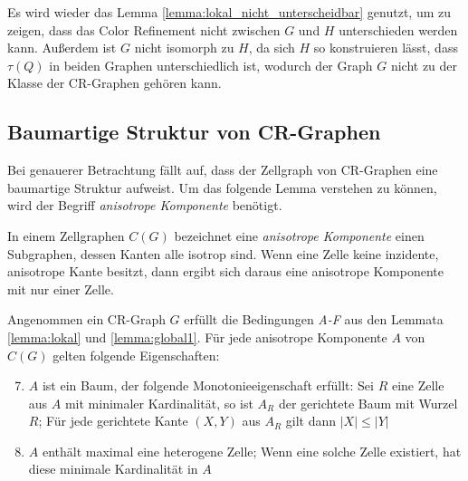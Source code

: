 Es wird wieder das Lemma \ref{lemma:lokal_nicht_unterscheidbar} genutzt, um zu zeigen, dass das Color Refinement nicht zwischen $G$ und $H$ unterschieden werden kann.
Außerdem ist $G$ nicht isomorph zu $H$, da sich $H$ so konstruieren lässt, dass $\tau (Q)$ in beiden Graphen unterschiedlich ist, wodurch der Graph $G$ nicht zu der Klasse der CR-Graphen gehören kann.

\subsection{Baumartige Struktur von CR-Graphen}
Bei genauerer Betrachtung fällt auf, dass der Zellgraph von CR-Graphen eine baumartige Struktur aufweist.
Um das folgende Lemma verstehen zu können, wird der Begriff \emph{anisotrope Komponente} benötigt.
\begin{Definition}
	In einem Zellgraphen $C(G)$ bezeichnet eine \emph{anisotrope Komponente} einen Subgraphen, dessen Kanten alle isotrop sind.
	Wenn eine Zelle keine inzidente, anisotrope Kante besitzt, dann ergibt sich daraus eine anisotrope Komponente mit nur einer Zelle.
\end{Definition}

\begin{Lemma}
	Angenommen ein CR-Graph $G$ erfüllt die Bedingungen \emph{A-F} aus den Lemmata \ref{lemma:lokal} und \ref{lemma:global1}.
	Für jede anisotrope Komponente $A$ von $C(G)$ gelten folgende Eigenschaften:
	
	\begin{enumerate}[label=(\Alph*)]
		\setcounter{enumi}{6}
		\item $A$ ist ein Baum, der folgende Monotonieeigenschaft erfüllt: Sei $R$ eine Zelle aus $A$ mit minimaler Kardinalität, so ist $A_R$ der gerichtete Baum mit Wurzel $R$; Für jede gerichtete Kante $(X,Y)$ aus $A_R$ gilt dann $|X|\leq |Y|$
		\item $A$ enthält maximal eine heterogene Zelle; Wenn eine solche Zelle existiert, hat diese minimale Kardinalität in $A$
	\end{enumerate}
	\label{lemma:global2}
\end{Lemma}

